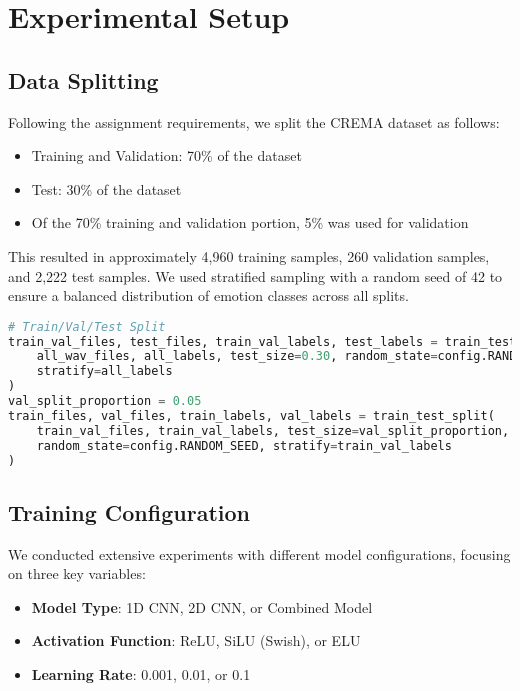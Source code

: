 \section{Experimental Setup}

\subsection{Data Splitting}

Following the assignment requirements, we split the CREMA dataset as follows:
\begin{itemize}
    \item Training and Validation: 70\% of the dataset
    \item Test: 30\% of the dataset
    \item Of the 70\% training and validation portion, 5\% was used for validation
\end{itemize}

This resulted in approximately 4,960 training samples, 260 validation samples, and 2,222 test samples. We used stratified sampling with a random seed of 42 to ensure a balanced distribution of emotion classes across all splits.

\begin{lstlisting}[language=Python, caption=Data Splitting Implementation]
# Train/Val/Test Split
train_val_files, test_files, train_val_labels, test_labels = train_test_split(
    all_wav_files, all_labels, test_size=0.30, random_state=config.RANDOM_SEED, 
    stratify=all_labels
)
val_split_proportion = 0.05 
train_files, val_files, train_labels, val_labels = train_test_split(
    train_val_files, train_val_labels, test_size=val_split_proportion, 
    random_state=config.RANDOM_SEED, stratify=train_val_labels
)
\end{lstlisting}

\subsection{Training Configuration}

We conducted extensive experiments with different model configurations, focusing on three key variables:
\begin{itemize}
    \item \textbf{Model Type}: 1D CNN, 2D CNN, or Combined Model
    \item \textbf{Activation Function}: ReLU, SiLU (Swish), or ELU
    \item \textbf{Learning Rate}: 0.001, 0.01, or 0.1
\end{itemize}

